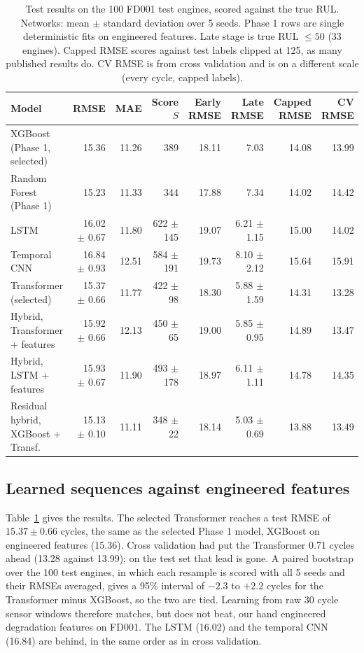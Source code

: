 \begin{table}[t]
\centering
\caption{Test results on the 100 FD001 test engines, scored against the
true RUL. Networks: mean $\pm$ standard deviation over 5 seeds. Phase 1 rows
are single deterministic fits on engineered features. Late stage is true
RUL $\le 50$ (33 engines). Capped RMSE scores against test labels clipped at
125, as many published results do. CV RMSE is from cross validation and is on
a different scale (every cycle, capped labels).}
\label{tab:dl-test}
\footnotesize
\setlength{\tabcolsep}{4pt}
\begin{tabular}{lrrrrrrr}
\hline
Model & RMSE & MAE & Score $S$ & Early RMSE & Late RMSE & Capped RMSE & CV RMSE \\
\hline
XGBoost (Phase 1, selected)  & 15.36 & 11.26 & 389 & 18.11 & 7.03 & 14.08 & 13.99 \\
Random Forest (Phase 1)      & 15.23 & 11.33 & 344 & 17.88 & 7.34 & 14.02 & 14.42 \\
\hline
LSTM                         & 16.02 $\pm$ 0.67 & 11.80 & 622 $\pm$ 145 & 19.07 & 6.21 $\pm$ 1.15 & 15.00 & 14.02 \\
Temporal CNN                 & 16.84 $\pm$ 0.93 & 12.51 & 584 $\pm$ 191 & 19.73 & 8.10 $\pm$ 2.12 & 15.64 & 15.91 \\
Transformer (selected)       & 15.37 $\pm$ 0.66 & 11.77 & 422 $\pm$ 98  & 18.30 & 5.88 $\pm$ 1.59 & 14.31 & 13.28 \\
\hline
Hybrid, Transformer + features & 15.92 $\pm$ 0.66 & 12.13 & 450 $\pm$ 65 & 19.00 & 5.85 $\pm$ 0.95 & 14.89 & 13.47 \\
Hybrid, LSTM + features      & 15.93 $\pm$ 0.67 & 11.90 & 493 $\pm$ 178 & 18.97 & 6.11 $\pm$ 1.11 & 14.78 & 14.35 \\
Residual hybrid, XGBoost + Transf. & 15.13 $\pm$ 0.10 & 11.11 & 348 $\pm$ 22 & 18.14 & 5.03 $\pm$ 0.69 & 13.88 & 13.49 \\
\hline
\end{tabular}
\end{table}

\subsection{Learned sequences against engineered features}
Table~\ref{tab:dl-test} gives the results. The selected Transformer reaches
a test RMSE of $15.37 \pm 0.66$ cycles, the same as the selected Phase 1
model, XGBoost on engineered features (15.36). Cross validation had put the
Transformer 0.71 cycles ahead (13.28 against 13.99); on the test set that
lead is gone. A paired bootstrap over the 100 test engines, in which each
resample is scored with all 5 seeds and their RMSEs averaged, gives a 95\%
interval of $-2.3$ to $+2.2$ cycles for the Transformer minus XGBoost, so the
two are tied. Learning from raw 30 cycle sensor windows therefore matches,
but does not beat, our hand engineered degradation features on FD001. The
LSTM (16.02) and the temporal CNN (16.84) are behind, in the same order as in
cross validation.

